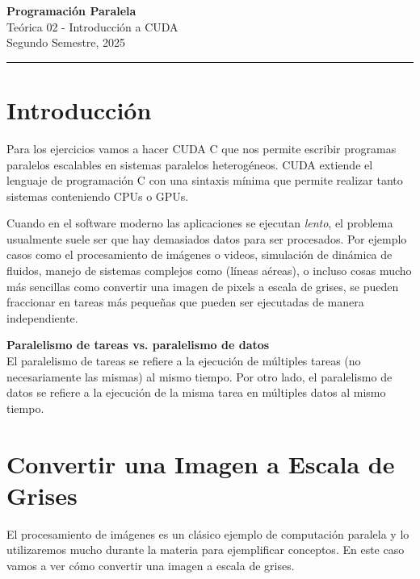 



\begin{center}
    \LARGE\textbf{Programación Paralela} \\
    \Large{Teórica 02 - Introducción a CUDA} \\
    \normalsize{Segundo Semestre, 2025} \\
    \vspace{1em}
    \hrule
\end{center}



\section*{Introducción}

Para los ejercicios vamos a hacer CUDA C que nos permite escribir programas paralelos escalables en sistemas paralelos
heterogéneos. CUDA extiende el lenguaje de programación C con una sintaxis mínima que permite realizar tanto sistemas
conteniendo CPUs o GPUs.

Cuando en el software moderno las aplicaciones se ejecutan \textit{lento}, el problema usualmente suele ser que hay
demasiados datos para ser procesados. Por ejemplo casos como el procesamiento de imágenes o videos, simulación de
dinámica de fluidos, manejo de sistemas complejos como (líneas aéreas), o incluso cosas mucho más sencillas como
convertir una imagen de pixels a escala de grises, se pueden fraccionar en tareas más pequeñas que pueden ser ejecutadas
de manera independiente.

\begin{tcolorbox}[colback=yellow,colframe=yellow!75!black,arc=0pt,outer arc=0pt]
  \textbf{Paralelismo de tareas vs. paralelismo de datos} \\

  El paralelismo de tareas se refiere a la ejecución de múltiples tareas (no necesariamente las mismas) al mismo tiempo.
  Por otro lado, el paralelismo de datos se refiere a la ejecución de la misma tarea en múltiples datos al mismo tiempo.
\end{tcolorbox}


\section*{Convertir una Imagen a Escala de Grises}

El procesamiento de imágenes es un clásico ejemplo de computación paralela y lo utilizaremos mucho durante la materia
para ejemplificar conceptos. En este caso vamos a ver cómo convertir una imagen a escala de grises.

